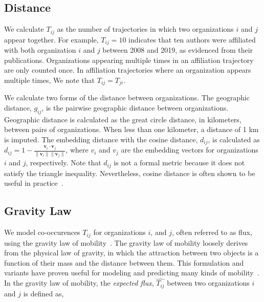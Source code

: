 \documentclass[12pt]{article} %
\begin{document}
%
%
\subsection*{Distance}
We calculate $T_{ij}$ as the number of trajectories in which two organizations $i$ and $j$ appear together.
For example, $T_{ij} = 10$ indicates that ten authors were affiliated with both organization $i$ and $j$ between 2008 and 2019, as evidenced from their publications.
Organizations appearing multiple times in an affiliation trajectory are only counted once. 
In affiliation trajectories where an organization appears multiple times, 
We note that $T_{ij} = T_{ji}$.

We calculate two forms of the distance between organizations.
The geographic distance, $g_{ij}$, is the pairwise geographic distance between organizations.
Geographic distance is calculated as the great circle distance, in kilometers, between pairs of organizations.
When less than one kilometer, a distance of 1 km is imputed.
The embedding distance with the cosine distance, $d_{ij}$, is calculated as $d_{ij} = 1 - \frac{\bm{v}_{i} \cdot \bm{v}_{j}}{\lVert \bm{v}_{i} \rVert \lVert \bm{v}_{j} \rVert}$,
where $v_i$ and $v_j$ are the embedding vectors for organizations $i$ and $j$, respectively.
Note that $d_{ij}$ is not a formal metric because it does not satisfy the triangle inequality.
Nevertheless, cosine distance is often shown to be useful in practice~\autocite{lerman2007embedding, brown1970migration, brown1970functional, kim2018functional}. 



%
%
\subsection*{Gravity Law}

We model co-occurences $T_{ij}$ for organizations $i$, and $j$, often referred to as flux, using the gravity law of mobility~\autocite{zipf1946gravity}.
The gravity law of mobility loosely derives from the physical law of gravity, in which the attraction between two objects is a function of their mass and the distance between them.
This formulation and variants have proven useful for modeling and predicting many kinds of mobility~\autocite{jung2008highwaygravity, curiel2018citygravity, lewer2008immigrationgravity, xia2005measlesgravity, truscott2012epidemicgravity, hong2016busgravity}.
In the gravity law of mobility, the \textit{expected flux}, $\hat{T_{ij}}$ between two organizations $i$ and $j$ is defined as,
\end{document}
